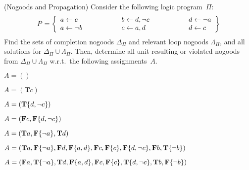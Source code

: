 \begin{Uebung}{(Nogoods and Propagation)}
Consider the following logic program~$\Pi$:
\[
\Pi =
\left\{
\begin{array}{r@{}c@{}l@{\hspace{20mm}}r@{}c@{}l@{\hspace{20mm}}r@{}c@{}l}
a & {} \leftarrow {} & c &
b & {} \leftarrow {} & d,\naf c &
d & {} \leftarrow {} & \naf a
\\
a & {} \leftarrow {} & \naf b &
c & {} \leftarrow {} & a,d &
d & {} \leftarrow {} & c
\end{array}
\right\}
\]
Find the sets of completion nogoods $\Delta_\Pi$ and
relevant loop nogoods $\Lambda_\Pi$,
and all solutions for $\Delta_\Pi\cup\Lambda_\Pi$.
Then, determine all unit-resulting or violated nogoods from 
$\Delta_\Pi\cup\Lambda_\Pi$ w.r.t.\ the following assignments~$A$.
\begin{UList}
\item
$A=\left(\right)$
\item
$A=\left(\mathbf{T}c\right)$
\item
$A=\left(\mathbf{T}\{d,{\neg{c}}\}\right)$
\item
$A=\left(\mathbf{F}c,\mathbf{F}\{d,{\neg{c}}\}\right)$
\item
$A=\left(\mathbf{T}a,\mathbf{F}\{{\neg{a}}\},\mathbf{T}d\right)$
\item
$A=\left(\mathbf{T}a,\mathbf{F}\{{\neg{a}}\},\mathbf{F}d,\mathbf{F}\{a,d\},\mathbf{F}c,\mathbf{F}\{c\},\mathbf{F}\{d,{\neg{c}}\},\mathbf{F}b,\mathbf{T}\{{\neg{b}}\}\right)$
\item
$A=\left(\mathbf{F}a,\mathbf{T}\{{\neg{a}}\},\mathbf{T}d,\mathbf{F}\{a,d\},\mathbf{F}c,\mathbf{F}\{c\},\mathbf{T}\{d,{\neg{c}}\},\mathbf{T}b,\mathbf{F}\{{\neg{b}}\}\right)$
\end{UList}
\end{Uebung}


